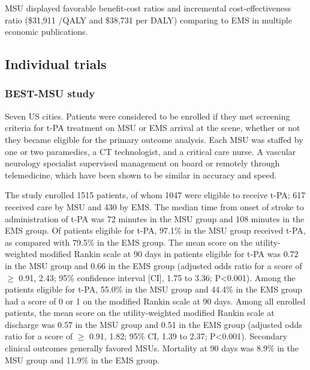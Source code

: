 MSU displayed favorable benefit-cost ratios and incremental cost-effectiveness ratio (\$31,911 /QALY and \$38,731 per DALY) comparing to EMS in multiple economic publications.


\subsection{Individual trials}

\subsubsection{BEST-MSU study \cite{grotta_prospective_2021}}

Seven US cities. Patients were considered to be enrolled if they met screening criteria for t-PA treatment on MSU or EMS arrival at the scene, whether or not they became eligible for the primary outcome analysis. Each MSU was staffed by one or two paramedics, a CT technologist, and a critical care nurse. A vascular neurology specialist supervised management on board or remotely through telemedicine, which have been shown to be similar in accuracy and speed.

The study enrolled 1515 patients, of whom 1047 were eligible to receive t-PA; 617 received care by MSU and 430 by EMS. The median time from onset of stroke to administration of t-PA was 72 minutes in the MSU group and 108 minutes in the EMS group. Of patients eligible for t-PA, 97.1\% in the MSU group received t-PA, as compared with 79.5\% in the EMS group. The mean score on the utility-weighted modified Rankin scale at 90 days in patients eligible for t-PA was 0.72 in the MSU group and 0.66 in the EMS group (adjusted odds ratio for a score of $\ge$ 0.91, 2.43; 95\% confidence interval [CI], 1.75 to 3.36; P<0.001). Among the patients eligible for t-PA, 55.0\% in the MSU group and 44.4\% in the EMS group had a score of 0 or 1 on the modified Rankin scale at 90 days. Among all enrolled patients, the mean score on the utility-weighted modified Rankin scale at discharge was 0.57 in the MSU group and 0.51 in the EMS group (adjusted odds ratio for a score of  $\ge$ 0.91, 1.82; 95\% CI, 1.39 to 2.37; P<0.001). Secondary clinical outcomes generally favored MSUs. Mortality at 90 days was 8.9\% in the MSU group and 11.9\% in the EMS group.

